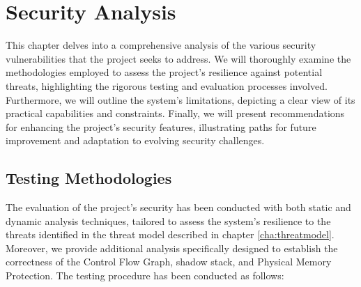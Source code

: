 \chapter{Security Analysis}
\label{cha:ta}

This chapter delves into a comprehensive analysis of the various security
vulnerabilities that the project seeks to address. We will thoroughly examine the
methodologies employed to assess the project's resilience against potential threats,
highlighting the rigorous testing and evaluation processes involved. Furthermore,
we will outline the system's limitations, depicting a clear view of its practical
capabilities and constraints. Finally, we will present recommendations for enhancing
the project's security features, illustrating paths for future improvement and
adaptation to evolving security challenges.

\section{Testing Methodologies}
\label{sec:ta_methodologies}

The evaluation of the project's security has been conducted with both static and
dynamic analysis techniques, tailored to assess the system's resilience to the
threats identified in the threat model described in chapter
\ref{cha:threatmodel}. Moreover, we provide additional analysis specifically
designed to establish the correctness of the Control Flow Graph, shadow stack,
and Physical Memory Protection. The testing procedure has been conducted as follows:

